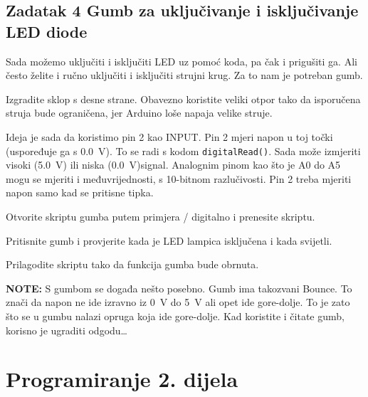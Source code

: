 \documentclass{arduino}
\begin{document}
\subsection{Zadatak 4 Gumb za uključivanje i isključivanje LED diode}


Sada možemo uključiti i isključiti LED uz pomoć koda, pa čak i prigušiti ga. Ali često želite i ručno uključiti i isključiti strujni krug. Za to nam je potreban gumb.

\begin{alphalist}
\item Izgradite sklop s desne strane. Obavezno koristite veliki otpor tako da isporučena struja bude ograničena, jer Arduino loše napaja velike struje.
\end{alphalist}

Ideja je sada da koristimo pin 2 kao INPUT. Pin 2 mjeri napon u toj točki (uspoređuje ga s \SI{0.0}{\volt}). To se radi s kodom \lstinline{digitalRead()}. Sada može izmjeriti visoki (\SI{5.0}{\volt}) ili niska (\SI{0.0}{\volt})signal. Analognim pinom kao što je A0 do A5 mogu se mjeriti i međuvrijednosti, s 10-bitnom razlučivosti. Pin 2 treba mjeriti napon samo kad se pritisne tipka.

\begin{alphalist}
\item Otvorite skriptu gumba putem primjera / digitalno i prenesite skriptu.

\item Pritisnite gumb i provjerite kada je LED lampica isključena i kada svijetli.

\item Prilagodite skriptu tako da funkcija gumba bude obrnuta.
\end{alphalist}


\textbf{NOTE:} S gumbom se događa nešto posebno. Gumb ima takozvani Bounce. To znači da napon ne ide izravno iz \SI{0}{\volt} do \SI{5}{\volt} ali opet ide gore-dolje. To je zato što se u gumbu nalazi opruga koja ide gore-dolje. Kad koristite i čitate gumb, korisno je ugraditi odgodu\dots

\newpage

\section{Programiranje 2. dijela}
\end{document}
